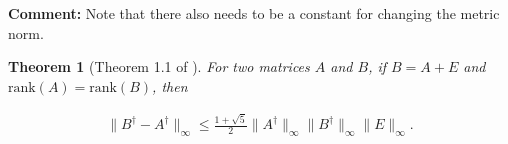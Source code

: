 \documentclass{article}
\newenvironment{comment}
  {\par\medskip
   \color{red}%
   \begin{framed}
   \textbf{Comment: }\ignorespaces}
 {\end{framed}
  \medskip}
\newtheorem{theorem}{Theorem}[section]
\theoremstyle{case}
\def\includeproofs{1}
\begin{document}
\begin{comment}
Note that there also needs to be a constant for changing the metric norm.
\end{comment}

\begin{theorem}[Theorem 1.1 of \cite{dummy:continuity_of_inverse}]
For two matrices $A$ and $B$, if $B = A + E$ and $\text{rank}(A) = \text{rank}(B)$, then

\begin{align*}
\|B^{\dagger} - A^{\dagger} \|_\infty \le \frac{1 + \sqrt{5}}{2} \|A^{\dagger}\|_\infty\|B^{\dagger}\|_\infty\|E\|_\infty.
\end{align*}
\end{theorem}

\color{red}
% 
% 
% 
% 
% 
% 
% 
% 
% 
\end{document}
